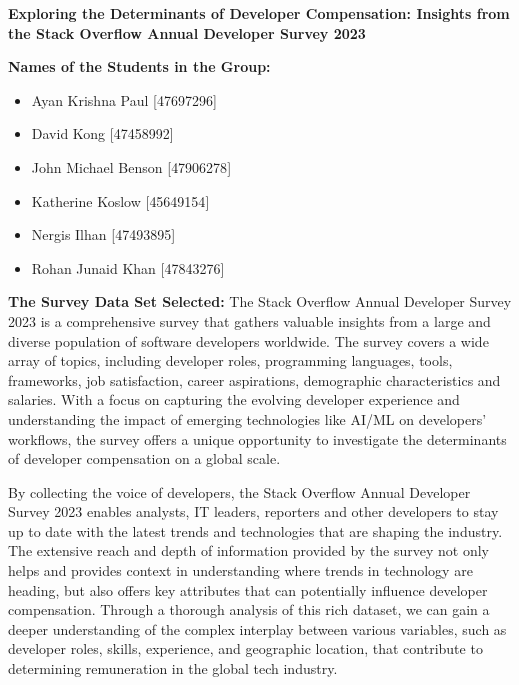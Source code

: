 \documentclass[
  12pt,
]{article}
\author{}
\date{\vspace{-2.5em}}
\begin{document}
\textbf{Exploring the Determinants of Developer Compensation: Insights
from the Stack Overflow Annual Developer Survey 2023}

\textbf{Names of the Students in the Group:}

\begin{itemize}
\item
  Ayan Krishna Paul {[}47697296{]}
\item
  David Kong {[}47458992{]}
\item
  John Michael Benson {[}47906278{]}
\item
  Katherine Koslow {[}45649154{]}
\item
  Nergis Ilhan {[}47493895{]}
\item
  Rohan Junaid Khan {[}47843276{]}
\end{itemize}

\textbf{The Survey Data Set Selected:} The Stack Overflow Annual
Developer Survey 2023 is a comprehensive survey that gathers valuable
insights from a large and diverse population of software developers
worldwide. The survey covers a wide array of topics, including developer
roles, programming languages, tools, frameworks, job satisfaction,
career aspirations, demographic characteristics and salaries. With a
focus on capturing the evolving developer experience and understanding
the impact of emerging technologies like AI/ML on developers' workflows,
the survey offers a unique opportunity to investigate the determinants
of developer compensation on a global scale.

By collecting the voice of developers, the Stack Overflow Annual
Developer Survey 2023 enables analysts, IT leaders, reporters and other
developers to stay up to date with the latest trends and technologies
that are shaping the industry. The extensive reach and depth of
information provided by the survey not only helps and provides context
in understanding where trends in technology are heading, but also offers
key attributes that can potentially influence developer compensation.
Through a thorough analysis of this rich dataset, we can gain a deeper
understanding of the complex interplay between various variables, such
as developer roles, skills, experience, and geographic location, that
contribute to determining remuneration in the global tech industry.
\end{document}
